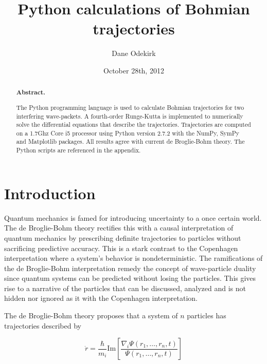 \documentclass[10pt, reqno]{article}
\title{Python calculations of Bohmian trajectories}
\author{Dane Odekirk}
\date{October 28th, 2012}
\begin{document}
 
\maketitle 
\pagebreak

\begin{abstract}
  \noindent 
  {\bf Abstract. } 

  The Python programming language is used to calculate Bohmian trajectories for two interfering wave-packets. 
  A fourth-order Runge-Kutta is implemented to numerically solve the differential equations that describe the trajectories.
  Trajectories are computed on a 1.7Ghz Core i5 processor using Python version 2.7.2 with the NumPy, SymPy and Matplotlib packages.
  All results agree with current de Broglie-Bohm theory.
  The Python scripts are referenced in the appendix.

\end{abstract}




\section{Introduction}

  Quantum mechanics is famed for introducing uncertainty to a once certain world.
  The de Broglie-Bohm theory rectifies this with a causal interpretation of quantum mechanics by 
    prescribing definite trajectories to particles without sacrificing predictive accuracy.
  This is a stark contrast to the Copenhagen interpretation where a system's behavior is nondeterministic.  
  The ramifications of the de Broglie-Bohm interpretation remedy the concept of wave-particle duality since
    quantum systems can be predicted without losing the particles.
  This gives rise to a narrative of the particles that can be discussed, analyzed and is not hidden nor ignored as it with 
    the Copenhagen interpretation.

  The de Broglie-Bohm theory proposes that a system of $n$ particles has trajectories described by 

  \begin{equation} \label{eq:trajectories}
    \dot{r} = \frac{\hbar}{m_i}\text{Im}[\frac{ \nabla_{i} \Psi(r_1,\dots,r_n,t)}{\Psi(r_1, \dots, r_n, t) } ]
  \end{equation}
\end{document}

